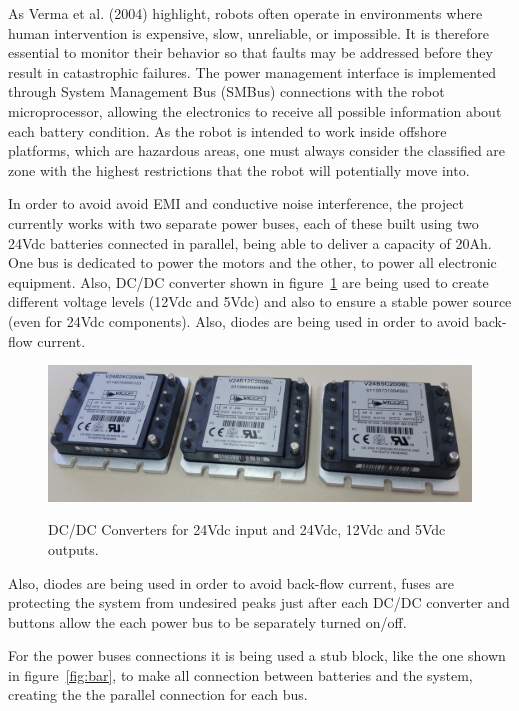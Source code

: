 \documentclass{ifacconf}
\begin{document}
As Verma et al. (2004) highlight, robots often operate in environments where
human intervention is expensive, slow, unreliable, or impossible. It is
therefore essential to monitor their behavior so that faults may be addressed
before they result in catastrophic failures. The power management interface is
implemented through System Management Bus (SMBus) connections with the robot
microprocessor, allowing the electronics to receive all possible information
about each battery condition. As the robot is intended to work inside offshore
platforms, which are hazardous areas, one must always consider the classified
are zone with the highest restrictions that the robot will potentially move
into.

In order to avoid avoid EMI and conductive noise interference, the project
currently works with two separate power buses, each of these built using two
24Vdc batteries connected in parallel, being able to deliver a capacity of
20Ah. One bus is dedicated to power the motors and the other, to power all
electronic equipment. Also, DC/DC converter shown in figure~\ref{fig:conv} are
being used to create different voltage levels (12Vdc and 5Vdc) and also to
ensure a stable power source (even for 24Vdc components). Also, diodes are
being used in order to avoid back-flow current.

\begin{figure}[ht]
\centering
    \includegraphics[width=1\columnwidth]{figs/Conversores.jpg}  %
    \label{fig:conv}
\caption{DC/DC Converters for 24Vdc input and 24Vdc, 12Vdc and 5Vdc outputs.}\vspace{-0.25cm}
\end{figure}

Also, diodes are being used in order to avoid back-flow current, fuses are
protecting the system from undesired peaks just after each DC/DC converter and
buttons allow the each power bus to be separately turned on/off.

For the power buses connections it is being used a stub block, like the one
shown in figure~\ref{fig:bar}, to make all connection between batteries and the
system, creating the the parallel connection for each bus.
\end{document}
